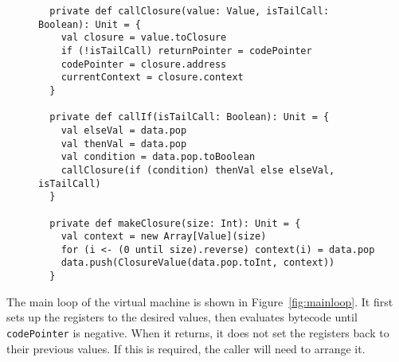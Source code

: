 \begin{figure}
\begin{verbatim}
  private def callClosure(value: Value, isTailCall: Boolean): Unit = {
    val closure = value.toClosure
    if (!isTailCall) returnPointer = codePointer
    codePointer = closure.address
    currentContext = closure.context
  }

  private def callIf(isTailCall: Boolean): Unit = {
    val elseVal = data.pop
    val thenVal = data.pop
    val condition = data.pop.toBoolean
    callClosure(if (condition) thenVal else elseVal, isTailCall)
  }

  private def makeClosure(size: Int): Unit = {
    val context = new Array[Value](size)
    for (i <- (0 until size).reverse) context(i) = data.pop
    data.push(ClosureValue(data.pop.toInt, context))
  }
\end{verbatim}
\getcaption
\end{figure}

The main loop of the virtual machine is shown in Figure~\ref{fig:mainloop}.
It first sets up the registers to the desired values,
then evaluates bytecode until \verb!codePointer! is negative.
When it returns,
it does not set the registers back to their previous values.
If this is required, the caller will need to arrange it.

